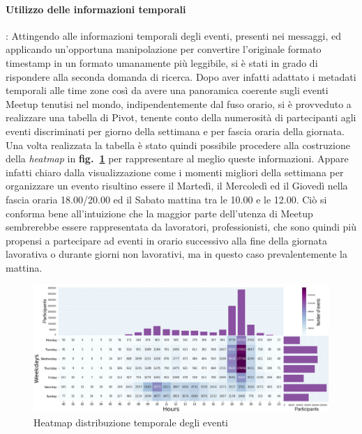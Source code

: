 \documentclass[fleqn,10pt]{SelfArx} %
\begin{document}
{\paragraph{Utilizzo delle informazioni temporali}:
Attingendo alle informazioni temporali degli eventi, presenti nei messaggi, ed applicando un'opportuna manipolazione per convertire l'originale formato timestamp in un formato umanamente più leggibile, si è stati in grado di rispondere alla seconda domanda di ricerca. 
Dopo aver infatti adattato i metadati temporali alle time zone così da avere una panoramica coerente sugli eventi Meetup tenutisi nel mondo, indipendentemente dal fuso orario, si è provveduto a realizzare una tabella di Pivot, tenente conto della numerosità di partecipanti agli eventi discriminati per giorno della settimana e per fascia oraria della giornata. 
Una volta realizzata la tabella è stato quindi possibile procedere alla costruzione della \textit{heatmap} in \textbf{fig.~\ref{plot_heatmap}} 
per rappresentare al meglio queste informazioni. 
Appare infatti chiaro dalla visualizzazione come i momenti migliori della settimana per organizzare un evento risultino essere il Martedì, il Mercoledì ed il Giovedì nella fascia oraria 18.00/20.00 ed il Sabato mattina tra le 10.00 e le 12.00. 
Ciò si conforma bene all'intuizione che la maggior parte dell'utenza di Meetup sembrerebbe essere rappresentata da lavoratori, professionisti, che sono quindi più propensi a partecipare ad eventi in orario successivo alla fine della giornata lavorativa o durante giorni non lavorativi, ma in questo caso prevalentemente la mattina.
\begin{figure}
\centering
\includegraphics[width = 9.2 cm, height = 5 cm]{heatmap_with_barplot_v3.jpg}
\caption{\label{plot_heatmap} Heatmap distribuzione temporale degli eventi}
\end{figure}
}
\end{document}
